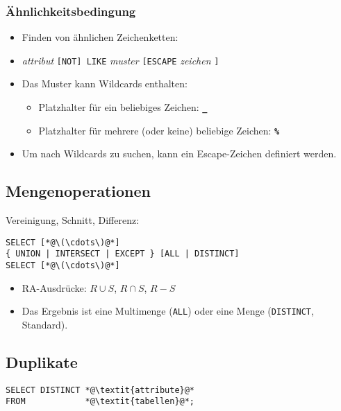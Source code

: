             \subsubsection{Ähnlichkeitsbedingung} %
                \begin{itemize}
                	\item Finden von ähnlichen Zeichenketten:
                	\item[] \textit{attribut} \lstinline|[NOT] LIKE| \textit{muster} \lstinline|[ESCAPE| \textit{zeichen} \lstinline|]|
                	\item Das Muster kann Wildcards enthalten:
                		\begin{itemize}
                			\item Platzhalter für ein beliebiges Zeichen: \textbf{\texttt{\_}}
                			\item Platzhalter für mehrere (oder keine) beliebige Zeichen: \textbf{\texttt{\%}}
                		\end{itemize}
                	\item Um nach Wildcards zu suchen, kann ein Escape-Zeichen definiert werden.
                \end{itemize}

        \subsection{Mengenoperationen} %
        	Vereinigung, Schnitt, Differenz:
            \begin{lstlisting}
SELECT [*@\(\cdots\)@*]
{ UNION | INTERSECT | EXCEPT } [ALL | DISTINCT]
SELECT [*@\(\cdots\)@*]
            \end{lstlisting}
            
            \begin{itemize}
            	\item RA-Ausdrücke: \( R \cup S \), \( R \cap S \), \( R - S \)
            	\item Das Ergebnis ist eine Multimenge (\lstinline|ALL|) oder eine Menge (\lstinline|DISTINCT|, Standard).
            \end{itemize}

        \subsection{Duplikate} %
            \begin{lstlisting}
SELECT DISTINCT *@\textit{attribute}@*
FROM            *@\textit{tabellen}@*;
            \end{lstlisting}
            
